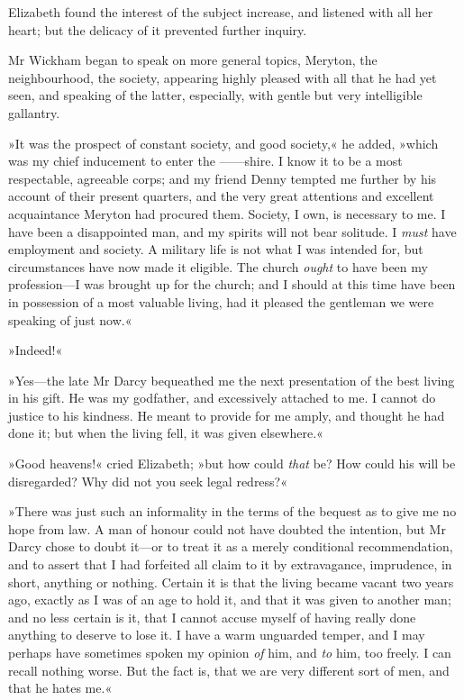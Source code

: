 Elizabeth found the interest of the subject increase, and listened with all her heart; but the delicacy of it prevented further inquiry.

Mr Wickham began to speak on more general topics, Meryton, the neighbourhood, the society, appearing highly pleased with all that he had yet seen, and speaking of the latter, especially, with gentle but very intelligible gallantry.

»It was the prospect of constant society, and good society,« he added, »which was my chief inducement to enter the ——shire. I know it to be a most respectable, agreeable corps; and my friend Denny tempted me further by his account of their present quarters, and the very great attentions and excellent acquaintance Meryton had procured them. Society, I own, is necessary to me. I have been a disappointed man, and my spirits will not bear solitude. I \textit{must} have employment and society. A military life is not what I was intended for, but circumstances have now made it eligible. The church \textit{ought} to have been my profession—I was brought up for the church; and I should at this time have been in possession of a most valuable living, had it pleased the gentleman we were speaking of just now.«

»Indeed!«

»Yes—the late Mr Darcy bequeathed me the next presentation of the best living in his gift. He was my godfather, and excessively attached to me. I cannot do justice to his kindness. He meant to provide for me amply, and thought he had done it; but when the living fell, it was given elsewhere.«

»Good heavens!« cried Elizabeth; »but how could \textit{that} be? How could his will be disregarded? Why did not you seek legal redress?«

»There was just such an informality in the terms of the bequest as to give me no hope from law. A man of honour could not have doubted the intention, but Mr Darcy chose to doubt it—or to treat it as a merely conditional recommendation, and to assert that I had forfeited all claim to it by extravagance, imprudence, in short, anything or nothing. Certain it is that the living became vacant two years ago, exactly as I was of an age to hold it, and that it was given to another man; and no less certain is it, that I cannot accuse myself of having really done anything to deserve to lose it. I have a warm unguarded temper, and I may perhaps have sometimes spoken my opinion \textit{of} him, and \textit{to} him, too freely. I can recall nothing worse. But the fact is, that we are very different sort of men, and that he hates me.«

